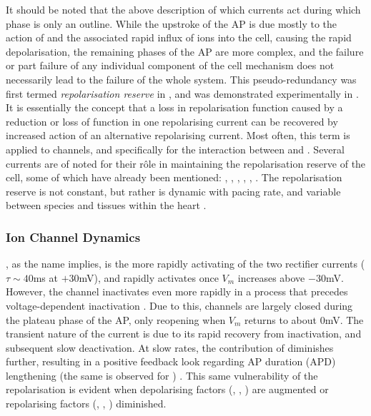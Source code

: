 \documentclass[../thesis-main.tex]{subfiles}
\begin{document}
 It should be noted that the above description of which currents act during which phase is only an outline. While the upstroke of the AP is due mostly to the action of \ina{} and the associated rapid influx of \na{} ions into the cell, causing the rapid depolarisation, the remaining phases of the AP are more complex, and the failure or part failure of any individual component of the cell mechanism does not necessarily lead to the failure of the whole system. This pseudo-redundancy was first termed \emph{repolarisation reserve} in \citet{Roden1998}, and was demonstrated experimentally in \citet{Varro2000}. It is essentially the concept that a loss in repolarisation function caused by a reduction or loss of function in one repolarising current can be recovered by increased action of an alternative repolarising current. Most often, this term is applied to \K{} channels, and specifically for the interaction between \ikr{} and \iks{} \citep{Xiao2008}. Several currents are of noted for their r\^ole in maintaining the repolarisation reserve of the cell, some of which have already been mentioned: \ikr{}, \iks{}, \ikix{}, \ito{}, \ica{}, \ina{} \citep{Varro2011}. The repolarisation reserve is not constant, but rather is dynamic with pacing rate, and variable between species and tissues within the heart \citep{Carmeliet2006}.
 
 \subsubsection{Ion Channel Dynamics}
 \label{subsubsec:channel-dynamics} 
 \ikr{}, as the name implies, is the more rapidly activating of the two rectifier \K{} currents ($\tau\sim40$ms at $+30$mV), and rapidly activates once $V_m$ increases above $-30$mV. However, the channel inactivates even more rapidly in a process that precedes voltage-dependent inactivation \citep{Varro2011, Spector1996, Carmeliet2006}. Due to this, \ikr{} channels are largely closed during the plateau phase of the AP, only reopening when $V_m$ returns to about 0mV. The transient nature of the current is due to its rapid recovery from inactivation, and subsequent slow deactivation. At slow rates, the contribution of \ikr{} diminishes further, resulting in a positive feedback look regarding AP duration (APD) lengthening (the same is observed for \ikix{}) \citep{Virag2009}. This same vulnerability of the repolarisation is evident when depolarising factors (\eg, \ina{}, \ica{}) are augmented or repolarising factors (\eg, \iks{}, \ikix{}) diminished.
 
\end{document}
